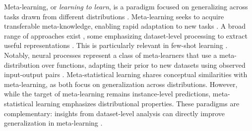 Meta-learning, or \textit{learning to learn}, is a paradigm focused on generalizing across tasks drawn from different distributions \cite{schmidhuber1996simple, hospedales2021meta, huisman2021survey}. Meta-learning seeks to acquire transferable meta-knowledge, enabling rapid adaptation to new tasks \cite{schmidhuber1987evolutionary, thrun1998lifelong, schmidhuber1993neural, vanschoren2019meta}. A broad range of approaches exist \cite{vinyals2016matching, santoro2016meta, finn2017model, snell2017prototypical}, some emphasizing dataset-level processing to extract useful representations \cite{mishra2017simple, ravi2017optimization, munkhdalai2017meta, shyam2017attentive}. This is particularly relevant in few-shot learning \cite{finn2017model, snell2017prototypical, wang2023few, wu2020meta, rivolli2022meta}. 
Notably, neural processes represent a class of meta-learners that use a meta-distribution over functions, adapting their prior to new datasets using observed input-output pairs \cite{garnelo2018neural, garnelo2018conditional, kim2019attentive}.
% 
Meta-statistical learning shares conceptual similarities with meta-learning, as both focus on generalization across distributions. However, while the target of meta-learning remains instance-level predictions, meta-statistical learning emphasizes distributional properties. These paradigms are complementary: insights from dataset-level analysis can directly improve generalization in meta-learning \cite{jomaa2021dataset2vec, kotlar2021novel, kobalczyk2025automatedknowledgeintegrationhumaninterpretable}.